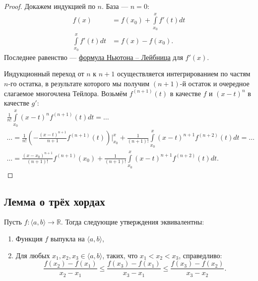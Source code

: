 \begin{proof}
	Докажем индукцией по \(n\). База ---  \(n = 0\):
	\begin{align*}
		f(x) &= f(x_0) + \int\limits_{x_0}^x f'(t) dt \\
		\int\limits_{x_0}^x f'(t) dt &= f(x) - f(x_0).
	\end{align*}
	Последнее равенство --- \hyperlink{Newton}{формула Ньютона -- Лейбница} для \(f'(x)\).
	
	Индукционный переход от \(n\) к \(n + 1\) осуществляется интегрированием по частям \(n\)-го остатка, в результате которого мы получим \((n + 1)\)-й остаток и очередное слагаемое многочлена Тейлора. Возьмём \(f^{(n + 1)}(t)\) в качестве \(f\) и \((x - t)^n\)
	в качестве \(g'\):
	\begin{gather*}
		\frac{1}{n!} \int\limits_{x_0}^x (x - t)^n f^{(n + 1)}(t) dt = \ldots \\
		\ldots = \frac{1}{n!} \left(-\frac{(x - t)^{n + 1}}{n + 1} f^{(n + 1)}(t)\right) \bigg|_{x_0}^x + \frac{1}{(n + 1)!} \int\limits_{x_0}^x (x - t)^{n + 1} f^{(n + 2)}(t) dt = \ldots \\
		\ldots = \frac{(x - x_0)^{n + 1}}{(n + 1)!} f^{(n + 1)}(x_0)
		+ \frac{1}{(n + 1)!} \int\limits_{x_0}^x (x - t)^{n + 1} f^{(n + 2)}(t) dt.
	\end{gather*}
\end{proof}

\subsection{Лемма о трёх хордах}

\hypertarget{trihordy}{}
\begin{theorem}
	Пусть \(f \colon \langle a, b \rangle \to \mathbb{R}\). Тогда следующие утверждения эквивалентны:
	\begin{enumerate}
		\item Функция \(f\) выпукла на \(\langle a, b \rangle\),
		\item Для любых \(x_1, x_2, x_3 \in \langle a, b \rangle\), таких, что \(x_1 < x_2 < x_3\), справедливо: \[
		\frac{f(x_2) - f(x_1)}{x_2 - x_1} \leqslant \frac{f(x_3) - f(x_1)}{x_3 - x_1} \leqslant \frac{f(x_3) - f(x_2)}{x_3 - x_2}.
		\]
	\end{enumerate}
\end{theorem}

